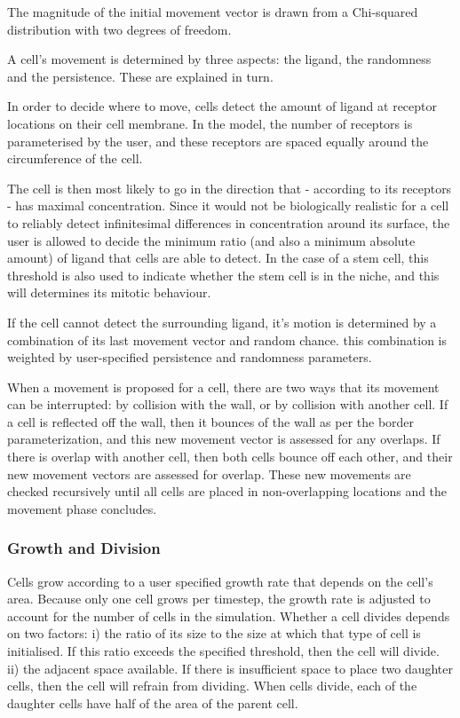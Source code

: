 \documentclass[12pt]{article}
\begin{document}
The magnitude of the initial movement vector is drawn from a Chi-squared 
distribution with two degrees of freedom. 

A cell's movement is determined by three aspects: the ligand, the 
randomness and the persistence. These are explained in turn.

In order to decide where to move, cells detect the amount of ligand at 
receptor locations on their cell membrane. In the model, the number of 
receptors is parameterised by the user, and these receptors are spaced 
equally around the circumference of the cell. 

The cell is then most likely to go in the direction that - according to 
its receptors - has maximal concentration. Since it would not be 
biologically realistic for a cell to reliably detect infinitesimal 
differences in concentration around its surface, the user is allowed to 
decide the minimum ratio (and also a minimum absolute amount) of ligand 
that cells are able to detect. In the case of a stem cell, this 
threshold is also used to indicate whether the stem cell is in the 
niche, and this will determines its mitotic behaviour.

If the cell cannot detect the surrounding ligand, it's motion is 
determined by a combination of its last movement vector and random 
chance. this combination is weighted by user-specified persistence and 
randomness parameters.

When a movement is proposed for a cell, there are two ways that its 
movement can be interrupted: by collision with the wall, or by collision 
with another cell. If a cell is reflected off the wall, then it bounces 
of the wall as per the border parameterization, and this new movement 
vector is assessed for any overlaps. If there is overlap with another 
cell, then both cells bounce off each other, and their new movement 
vectors are assessed for overlap. These new movements are checked 
recursively until all cells are placed in non-overlapping locations and 
the movement phase concludes.

\subsubsection{Growth and Division}
Cells grow according to a user specified growth rate that depends on the 
cell's area. Because only one cell grows per timestep, the growth rate 
is adjusted to account for the number of cells in the simulation. 
Whether a cell divides depends on two factors: i) the ratio of its size 
to the size at which that type of cell is initialised. If this ratio 
exceeds the specified threshold, then the cell will divide. ii) the 
adjacent space available. If there is insufficient space to place two 
daughter cells, then the cell will refrain from dividing. When cells 
divide, each of the daughter cells have half of the area of the parent 
cell. 
\end{document}
